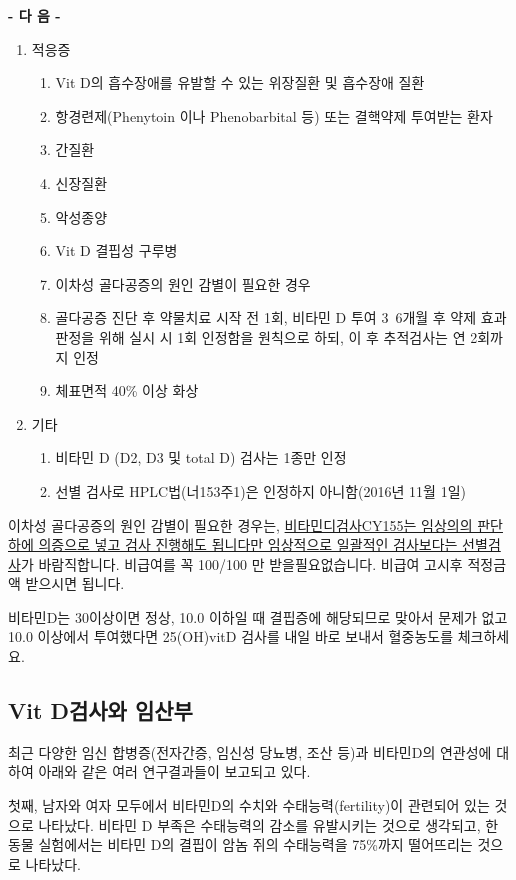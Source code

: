 {
\par
\begin{center}\textbf{- 다          음 -}\end{center}
\begin{enumerate}[가.]\tightlist
\item 적응증
\begin{enumerate}[1)]\tightlist
\item Vit D의 흡수장애를 유발할 수 있는 위장질환 및 흡수장애 질환
\item 항경련제(Phenytoin 이나 Phenobarbital 등) 또는 결핵약제 투여받는 환자
\item 간질환                    
\item 신장질환                 
\item 악성종양
\item Vit D 결핍성 구루병
\item 이차성 골다공증의 원인 감별이 필요한 경우
\item 골다공증 진단 후 약물치료 시작 전 1회, 비타민 D 투여 3~6개월 후 약제 효과 판정을 위해 실시 시 1회 인정함을 원칙으로 하되, 이 후 추적검사는 연 2회까지 인정
\item 체표면적 40\% 이상 화상
\end{enumerate}
\item 기타
\begin{enumerate}[1)]\tightlist
\item 비타민 D (D2, D3 및 total D) 검사는 1종만 인정
\item 선별 검사로 HPLC법(너153주1)은 인정하지 아니함(2016년 11월 1일)
\end{enumerate}
\end{enumerate}
이차성 골다공증의 원인 감별이 필요한 경우는, \uline{비타민디검사CY155는 임상의의 판단하에 의증으로 넣고 검사 진행해도 됩니다만 임상적으로 일괄적인 검사보다는 선별검사}가 바람직합니다.  비급여를 꼭 100/100 만 받을필요없습니다. 비급여 고시후 적정금액 받으시면 됩니다.\par
비타민D는 30이상이면 정상, 10.0 이하일 때 결핍증에 해당되므로 맞아서 문제가 없고 10.0 이상에서 투여했다면 25(OH)vitD 검사를 내일 바로 보내서 혈중농도를 체크하세요.
}

\subsection{Vit D검사와 임산부}
최근 다양한 임신 합병증(전자간증, 임신성 당뇨병, 조산 등)과 비타민D의 연관성에 대하여 아래와 같은 여러 연구결과들이 보고되고 있다.\par
첫째, 남자와 여자 모두에서 비타민D의 수치와 수태능력(fertility)이 관련되어 있는 것으로 나타났다. 비타민 D 부족은 수태능력의 감소를 유발시키는 것으로 생각되고, 한 동물 실험에서는 비타민 D의 결핍이 암놈 쥐의 수태능력을 75\%까지 떨어뜨리는 것으로 나타났다.

